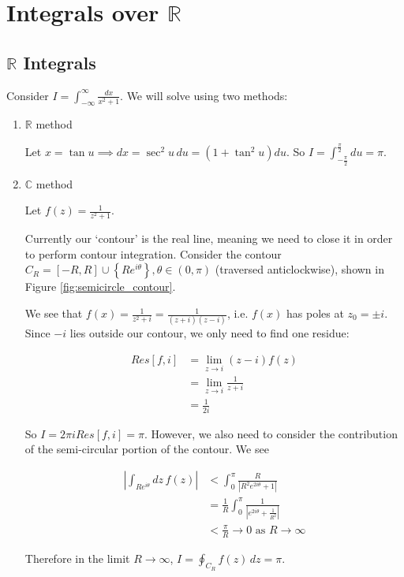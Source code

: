\documentclass{physics_notes}
\begin{document}
\section{Integrals over $\mathbb{R}$}

\subsection{$\mathbb{R}$ Integrals }

Consider $I = \int_{-\infty}^\infty \frac{dx}{x^2 + 1}$. We will solve using two methods:

\begin{enumerate}[label=\alph*)]
	\item{
		$\mathbb{R}$ method \newline

		Let $x = \tan{u} \implies dx = \sec^2{u}\, du = (1+\tan^2{u})du$. So $I = \int_{-\frac{\pi}{2}}^{\frac{\pi}{2}} du = \pi $.
	}

	\item{
		$\mathbb{C}$ method \newline

		Let $f(z) = \frac{1}{z^2 + 1}$.

		Currently our `contour' is the real line, meaning we need to close it in order to perform contour integration. Consider the contour $C_R = [-R, R]\cup \left\{Re^{i\theta}\right\}, \theta \in (0,\pi)$ (traversed anticlockwise), shown in Figure \ref{fig:semicircle_contour}.

		We see that $f(x) = \frac{1}{z^2 + i} = \frac{1}{(z+i)(z-i)}$, i.e. $f(x)$ has poles at $z_0 = \pm i$. Since $-i$ lies outside our contour, we only need to find one residue:

		\begin{align*}
			Res[f,i] &= \lim_{z\to i} (z - i)f(z) \\
			&= \lim_{z\to i} \frac{1}{z + i} \\
			&= \frac{1}{2i}
		\end{align*}

		So $I = 2\pi i Res[f,i] = \pi$. However, we also need to consider the contribution of the semi-circular portion of the contour. We see

		\begin{align*}
			\left|\int_{Re^{i\theta}} dz\, f(z)\right| &< \int_0^{\pi} \frac{R}{|R^2 e^{2i\theta} + 1|} \\
			&= \frac{1}{R}\int_0^{\pi} \frac{1}{|e^{2i\theta} + \frac{1}{R^2}|} \\
			&< \frac{\pi}{R} \to 0 \text{ as } R \to \infty 
		\end{align*}

		Therefore in the limit $R\to\infty$, $I = \oint_{C_R} f(z)\, dz = \pi$. 
	}
\end{enumerate}
\end{document}
